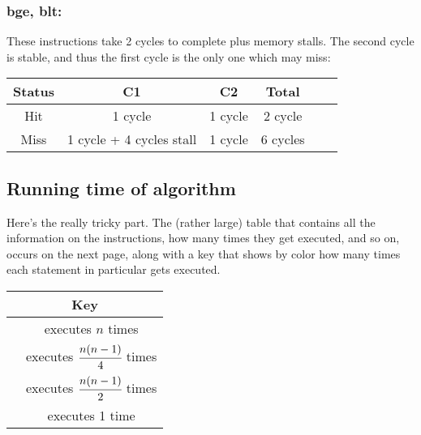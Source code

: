 \documentclass[a4paper]{article}
\begin{document}
\subsubsection{\large bge, blt:}

These instructions take 2 cycles to complete plus memory stalls. The second cycle is stable, and thus the first cycle is the only one which may miss:

\begin{center}
\begin{tabular}{|c|c|c|c|c|c|}
\hline
\textbf{Status} & \textbf{C1} & \textbf{C2} & \textbf{Total} \\
\hline
\hline
Hit & 1 cycle & 1 cycle & 2 cycle \\
\hline
Miss & 1 cycle + 4 cycles stall & 1 cycle & 6 cycles \\
\hline
\end{tabular}
\end{center}

\subsection{Running time of algorithm}

Here's the really tricky part. The (rather large) table that contains all the information on the instructions, how many times they get executed, and so on, occurs on the next page, along with a key that shows by color how many times each statement in particular gets executed.

\pagebreak[4]

\begin{center}
\begin{tabular}{|c|c|}
\hline
\multicolumn{2}{|c|}{Key} \\
\hline
\cellcolor{red} & executes $n$ times \\
\hline
\cellcolor{green} & executes $\cfrac{n(n-1)}{4}$ times \\
\hline
\cellcolor{yellow} & executes $\cfrac{n(n-1)}{2}$ times \\
\hline
\cellcolor{black} & executes 1 time \\
\hline
\end{tabular}
\end{center}
\end{document}
